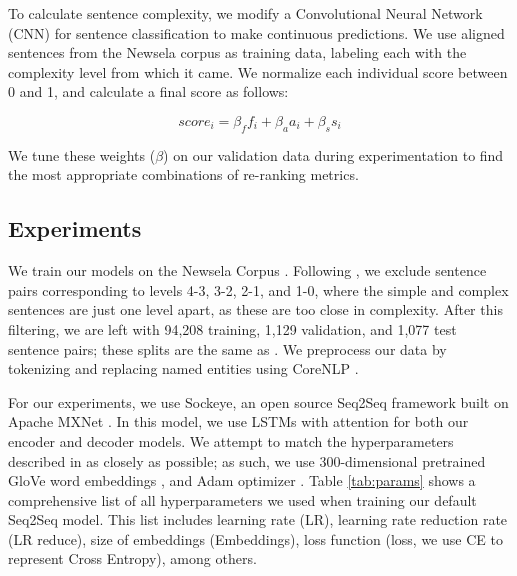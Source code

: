 \documentclass[thesis.tex]{subfiles}
\begin{document}
To calculate sentence complexity, we modify a Convolutional Neural Network (CNN) for sentence classification \citep{kim2014convolutional} to make continuous predictions. We use aligned sentences from the Newsela corpus \citep{xu2015problems} as training data, labeling each with the complexity level from which it came. We normalize each individual score between 0 and 1, and calculate a final score as follows:

\begin{equation}
    score_i = \beta_ff_i + \beta_aa_i + \beta_ss_i
\end{equation}

We tune these weights (\textbf{$\beta$}) on our validation data during experimentation to find the most appropriate combinations of re-ranking metrics.

\subsection{Experiments} \label{sec:sentence_experiments}

We train our models on the Newsela Corpus \citep{xu2015problems}. Following \cite{zhang2017sentence}, we exclude sentence pairs corresponding to levels 4-3, 3-2, 2-1, and 1-0, where the simple and complex sentences are just one level apart, as these are too close in complexity. After this filtering, we are left with 94,208 training, 1,129 validation, and 1,077 test sentence pairs; these splits are the same as \cite{zhang2017sentence}. We preprocess our data by tokenizing and replacing named entities using CoreNLP \citep{manning2014stanford}. 

For our experiments, we use Sockeye, an open source Seq2Seq framework built on Apache MXNet \citep{hieber2017sockeye,chen2015mxnet}. In this model, we use LSTMs with attention for both our encoder and decoder models. We attempt to match the hyperparameters described in \cite{zhang2017sentence} as closely as possible; as such, we use 300-dimensional pretrained GloVe word embeddings \citep{pennington2014glove}, and Adam optimizer \citep{kingma2015adam}. Table \ref{tab:params} shows a comprehensive list of all hyperparameters we used when training our default Seq2Seq model. This list includes learning rate (LR), learning rate reduction rate (LR reduce), size of embeddings (Embeddings), loss function (loss, we use CE to represent Cross Entropy), among others. 
\end{document}
